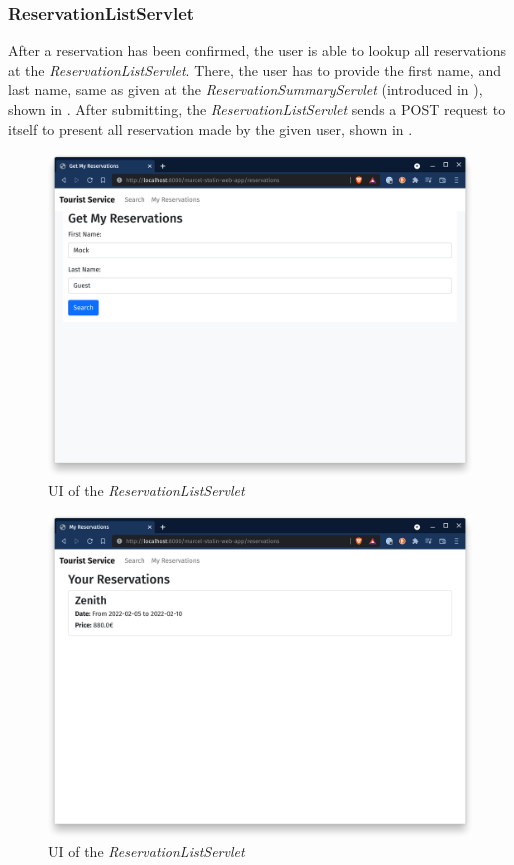 \subsubsection{ReservationListServlet}\label{sec:02_design_web_myreservations}
After a reservation has been confirmed, the user is able to lookup all reservations at the \textit{ReservationListServlet}. 
There, the user has to provide the first name, and last name, same as given at the \textit{ReservationSummaryServlet} (introduced in ), shown in . After submitting, the \textit{ReservationListServlet} sends a POST request to itself to present all reservation made by the given user, shown in .

\begin{figure}[h]
\centering
\includegraphics[scale=0.14]{images/02_design/web-app-my-reservations-1}
\caption{UI of the \textit{ReservationListServlet}}
\label{fig:02_design_web_myreservations_page_1}
\end{figure}

\newpage
\begin{figure}[h]
\centering
\includegraphics[scale=0.14]{images/02_design/web-app-my-reservations-2}
\caption{UI of the \textit{ReservationListServlet}}
\label{fig:02_design_web_myreservations_page_2}
\end{figure}
